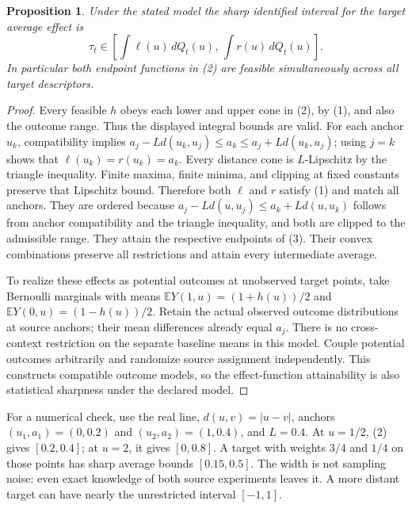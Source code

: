 \documentclass[11pt]{article}
\newtheorem{proposition}{Proposition}
\newcommand{\E}{\mathbb{E}}
\begin{document}
\begin{proposition}
Under the stated model the sharp identified interval for the target
average effect is
\[
 \tau_t\in\left[\int\ell(u)\,dQ_t(u),\,
                 \int r(u)\,dQ_t(u)\right].              \tag{3}
\]
In particular both endpoint functions in (2) are feasible simultaneously
across all target descriptors.
\end{proposition}
\begin{proof}
Every feasible $h$ obeys each lower and upper cone in (2), by (1), and
also the outcome range. Thus the displayed integral bounds are valid.
For each anchor $u_k$, compatibility implies
$a_j-Ld(u_k,u_j)\le a_k\le a_j+Ld(u_k,u_j)$; using $j=k$
shows that $\ell(u_k)=r(u_k)=a_k$.
Every distance cone is $L$-Lipschitz by the triangle inequality.
Finite maxima, finite minima, and clipping at fixed constants preserve
that Lipschitz bound. Therefore both $\ell$ and $r$ satisfy (1) and
match all anchors. They are ordered because
$a_j-Ld(u,u_j)\le a_k+Ld(u,u_k)$ follows from anchor
compatibility and the triangle inequality, and both are clipped to the
admissible range. They attain the respective endpoints of (3).
Their convex combinations preserve all restrictions and attain every
intermediate average.

To realize these effects as potential outcomes at unobserved target
points, take Bernoulli marginals with means
$\E Y(1,u)=(1+h(u))/2$ and $\E Y(0,u)=(1-h(u))/2$.
Retain the actual observed outcome distributions at source anchors; their
mean differences already equal $a_j$. There is no cross-context
restriction on the separate baseline means in this model. Couple
potential outcomes arbitrarily and randomize source assignment independently.
This constructs compatible outcome models, so the effect-function
attainability is also statistical sharpness under the declared model.
\end{proof}

For a numerical check, use the real line, $d(u,v)=|u-v|$, anchors
$(u_1,a_1)=(0,0.2)$ and $(u_2,a_2)=(1,0.4)$, and $L=0.4$.
At $u=1/2$, (2) gives $[0.2,0.4]$; at $u=2$, it gives $[0,0.8]$.
A target with weights $3/4$ and $1/4$ on those points has sharp average
bounds $[0.15,0.5]$. The width is not sampling noise: even exact knowledge
of both source experiments leaves it. A more distant target can have
nearly the unrestricted interval $[-1,1]$.
\end{document}
